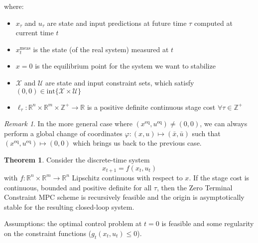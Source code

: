 \documentclass[openany]{book}
\theoremstyle{definition}
\newtheorem{theorem}{Theorem}[section]
\theoremstyle{remark}
\newtheorem*{remark}{Remark}
\begin{document}
where:
\begin{itemize}
    \item $x_\tau$ and $u_\tau$ are state and input predictions at future time $\tau$ computed at current time $t$
    \item $x_t^{\text{meas}}$ is the state (of the real system) measured at $t$
    \item $x=0$ is the equilibrium point for the system we want to stabilize
    \item $\mathcal{X}$ and $\mathcal{U}$ are state and input constraint sets, which satisfy $(0,0) \in \text{int}\{\mathcal{X} \times \mathcal{U}\}$
    \item $\ell_\tau: \mathbb{R}^n \times \mathbb{R}^m \times \mathbb{Z}^+ \to \mathbb{R}$ is a positive definite continuous stage cost $\forall \tau \in \mathbb{Z}^+$
\end{itemize}

\begin{remark}
In the more general case where $(x^{\text{eq}},u^{\text{eq}}) \neq (0,0)$, we can always perform a global change of coordinates $\varphi:(x,u) \mapsto (\bar{x},\bar{u})$ such that $(x^{\text{eq}},u^{\text{eq}}) \mapsto (0,0)$ which brings us back to the previous case.
\end{remark}

\begin{theorem}
Consider the discrete-time system
\[
    x_{t+1} = f(x_t,u_t)
\]
with $f:\mathbb{R}^n \times \mathbb{R}^m \to \mathbb{R}^n$ Lipschitz continuous with respect to $x$. If the stage cost is continuous, bounded and positive definite for all $\tau$, then the Zero Terminal Constraint MPC scheme is recursively feasible and the origin is asymptotically stable for the resulting closed-loop system.

Assumptions: the optimal control problem at $t=0$ is feasible and some regularity on the constraint functions ($g_t(x_t,u_t) \leq 0$).
\end{theorem}
\end{document}

